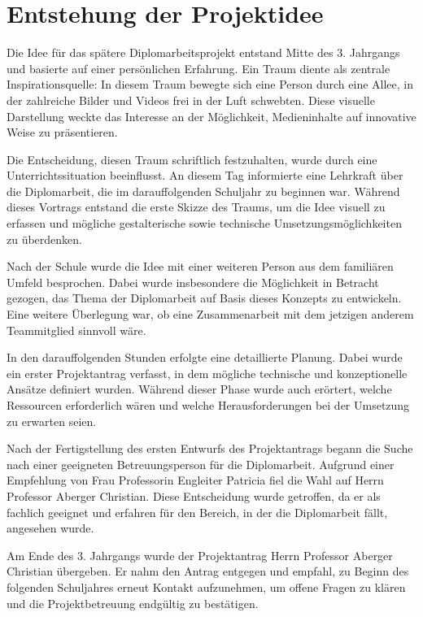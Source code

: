 
\section{Entstehung der Projektidee}

Die Idee für das spätere Diplomarbeitsprojekt entstand Mitte des 3. Jahrgangs 
und basierte auf einer persönlichen Erfahrung. Ein Traum diente als zentrale 
Inspirationsquelle: In diesem Traum bewegte sich eine Person durch eine Allee, 
in der zahlreiche Bilder und Videos frei in der Luft schwebten. Diese visuelle 
Darstellung weckte das Interesse an der Möglichkeit, Medieninhalte auf innovative 
Weise zu präsentieren.

Die Entscheidung, diesen Traum schriftlich festzuhalten, wurde durch eine 
Unterrichtssituation beeinflusst. An diesem Tag informierte eine Lehrkraft 
über die Diplomarbeit, die im darauffolgenden Schuljahr zu beginnen war. Während 
dieses Vortrags entstand die erste Skizze des Traums, um die Idee visuell zu erfassen 
und mögliche gestalterische sowie technische Umsetzungsmöglichkeiten zu überdenken.

Nach der Schule wurde die Idee mit einer weiteren Person aus dem familiären Umfeld 
besprochen. Dabei wurde insbesondere die Möglichkeit in Betracht gezogen, das Thema 
der Diplomarbeit auf Basis dieses Konzepts zu entwickeln. Eine weitere Überlegung war, 
ob eine Zusammenarbeit mit dem jetzigen anderem Teammitglied sinnvoll wäre.

In den darauffolgenden Stunden erfolgte eine detaillierte Planung. Dabei wurde ein 
erster Projektantrag verfasst, in dem mögliche technische und konzeptionelle Ansätze 
definiert wurden. Während dieser Phase wurde auch erörtert, welche Ressourcen 
erforderlich wären und welche Herausforderungen bei der Umsetzung zu erwarten 
seien.

Nach der Fertigstellung des ersten Entwurfs des Projektantrags begann die Suche nach 
einer geeigneten Betreuungsperson für die Diplomarbeit. Aufgrund einer Empfehlung von 
Frau Professorin Engleiter Patricia fiel die Wahl auf Herrn Professor Aberger 
Christian. Diese Entscheidung wurde getroffen, da er als fachlich geeignet und 
erfahren für den Bereich, in der die Diplomarbeit fällt, angesehen wurde.

Am Ende des 3. Jahrgangs wurde der Projektantrag Herrn Professor Aberger Christian 
übergeben. Er nahm den Antrag entgegen und empfahl, zu Beginn des folgenden Schuljahres 
erneut Kontakt aufzunehmen, um offene Fragen zu klären und die Projektbetreuung 
endgültig zu bestätigen.


